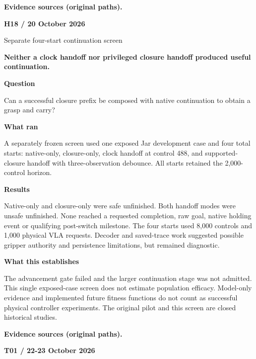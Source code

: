 \documentclass[11pt,a4paper]{article}
\newcommand{\block}[2]{\par\textbf{\color{ink}#1}\par\nopagebreak #2\par}
\newcommand{\finding}[1]{\begin{tcolorbox}[colback=pale,colframe=pale,boxrule=0pt,arc=1mm,left=10pt,right=10pt,top=10pt,bottom=10pt]\color{ink}\large\bfseries #1\end{tcolorbox}}
\begin{document}
\vfill{\footnotesize\color{muted}\textbf{Evidence sources (original paths).}\par
\raggedright {}\par {}}
\clearpage
{}\label{exp:H18}
{\color{accent}\small\bfseries H18 / 20 October 2026}\par
{}\par
{\color{muted}\small Separate four-start continuation screen}\par\vspace{2mm}
\finding{Neither a clock handoff nor privileged closure handoff produced useful continuation.}
\block{Question}{Can a successful closure prefix be composed with native continuation to obtain a grasp and carry?}
\block{What ran}{A separately frozen screen used one exposed Jar development case and four total starts: native-only, closure-only, clock handoff at control 488, and supported-closure handoff with three-observation debounce. All starts retained the 2,000-control horizon.}
\block{Results}{Native-only and closure-only were safe unfinished. Both handoff modes were unsafe unfinished. None reached a requested completion, raw goal, native holding event or qualifying post-switch milestone. The four starts used 8,000 controls and 1,000 physical VLA requests. Decoder and saved-trace work suggested possible gripper authority and persistence limitations, but remained diagnostic.}
\block{What this establishes}{The advancement gate failed and the larger continuation stage was not admitted. This single exposed-case screen does not estimate population efficacy. Model-only evidence and implemented future fitness functions do not count as successful physical controller experiments. The original pilot and this screen are closed historical studies.}
\vfill{\footnotesize\color{muted}\textbf{Evidence sources (original paths).}\par
\raggedright {}\par {}}
\clearpage
{}\label{exp:T01}
{\color{accent}\small\bfseries T01 / 22-23 October 2026}\par
{}\par
\end{document}
